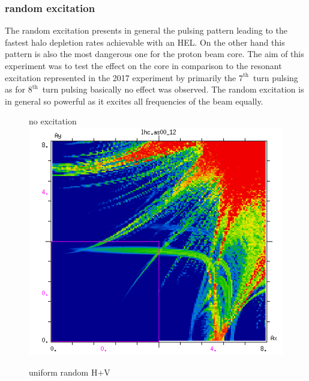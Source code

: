 \documentclass[%
 reprint,
 amsmath,amssymb,
 aps,
prstab,
]{revtex4-1}
\begin{document}
\subsubsection{random excitation\label{sec:simexran}}
The random excitation presents in general the pulsing pattern leading to the fastest halo depletion rates achievable with an HEL. On the other hand this pattern is also the most dangerous one for the proton beam core. The aim of this experiment was to test the effect on the core in comparison to the resonant excitation represented in the 2017 experiment by primarily the $7^{\mathrm{th}}$~turn pulsing as for $8^{\mathrm{th}}$~turn pulsing basically no effect was observed. The random excitation is in general so powerful as it excites all frequencies of the beam equally.
\begin{figure}[h]
	\begin{minipage}[t]{0.49\linewidth}
		\centering
		no excitation
		\includegraphics[width=1.0\linewidth]{2017injnocolc15o+19_6noerru_dp0_amp.png}
	\end{minipage}
	\begin{minipage}[t]{0.49\linewidth}
		\centering
		uniform random H+V

\end{minipage}
\end{figure}
\end{document}
